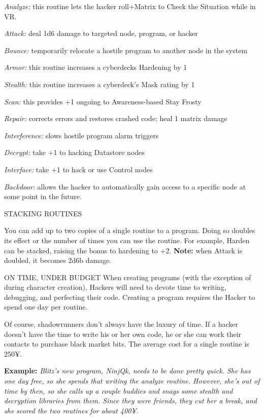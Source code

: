 \documentclass[oneside,10pt]{article}
\begin{document}
\begin{multicols}{2}
\begin{adjustwidth*}{.5cm}{.5cm}

\textit{Analyze:} this routine lets the hacker roll+Matrix to Check
the Situation while in VR.

\textit{Attack:} deal 1d6 damage to targeted node, program, or
hacker

\textit{Bounce:} temporarily relocate a hostile program to another
node in the system

\textit{Armor:} this routine increases a cyberdecks Hardening by 1

\textit{Stealth:} this routine increases a cyberdeck’s Mask rating
by 1

\textit{Scan:} this provides +1 ongoing to Awareness-based Stay
Frosty

\textit{Repair:} corrects errors and restores crashed code; heal 1
matrix damage

\textit{Interference:} slows hostile program alarm triggers

\textit{Decrypt:} take +1 to hacking Datastore nodes

\textit{Interface:} take +1 to hack or use Control nodes

\textit{Backdoor:} allows the hacker to automatically gain access
to a specific node at some point in the future.
\end{adjustwidth*}
STACKING ROUTINES

You can add up to two copies of a single routine to a program. Doing so doubles its effect or the number of times you
can use the routine. For example, Harden can be stacked,
raising the bonus to hardening to +2. \textbf{Note:} when Attack is
doubled, it becomes 2d6b damage.

ON TIME, UNDER BUDGET
When creating programs (with the exception of during character creation), Hackers will need to devote time to writing,
debugging, and perfecting their code. Creating a program
requires the Hacker to spend one day per routine.

Of course, shadowrunners don’t always have the luxury of
time. If a hacker doesn’t have the time to write his or her own
code, he or she can work their contacts to purchase black
market bits. The average cost for a single routine is 250¥.
\begin{adjustwidth*}{.5cm}{.5cm}

\textbf{Example:} \textit{Blitz’s new program, NinjQk, needs to be done
pretty quick. She has one day free, so she spends that
writing the analyze routine. However, she’s out of time
by then, so she calls up a couple buddies and snags some
stealth and decryption libraries from them. Since they were
friends, they cut her a break, and she scored the two routines for about 400¥.}
\end{adjustwidth*}

\end{multicols}
\end{document}
